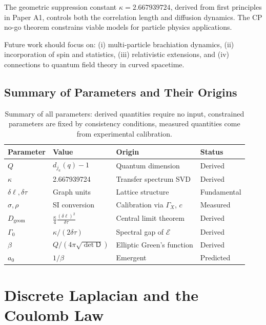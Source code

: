 \documentclass[11pt]{article}
\theoremstyle{plain}
\theoremstyle{definition}
\begin{document}
The geometric suppression constant $\kappa = 2.667939724$, derived from first principles in Paper A1, controls both the correlation length and diffusion dynamics. The CP no-go theorem constrains viable models for particle physics applications.

Future work should focus on: (i) multi-particle brachiation dynamics, (ii) incorporation of spin and statistics, (iii) relativistic extensions, and (iv) connections to quantum field theory in curved spacetime.

\subsection{Summary of Parameters and Their Origins}

\begin{table}[h]
  \centering
  \begin{tabular}{|l|l|l|l|}
    \hline
    \textbf{Parameter} & \textbf{Value} & \textbf{Origin} & \textbf{Status} \\
    \hline
    $Q$ & $d_{j_a}(q) - 1$ & Quantum dimension & Derived \\
    $\kappa$ & 2.667939724 & Transfer spectrum SVD & Derived \\
    $\delta\ell, \delta\tau$ & Graph units & Lattice structure & Fundamental \\
    $\sigma, \rho$ & SI conversion & Calibration via $\Gamma_X$, $c$ & Measured \\
    $D_{\mathrm{geom}}$ & $\frac{\kappa}{4}\frac{(\delta\ell)^2}{\delta\tau}$ & Central limit theorem & Derived \\
    $\Gamma_0$ & $\kappa/(2\delta\tau)$ & Spectral gap of $\mathcal{E}$ & Derived \\
    $\beta$ & $Q/(4\pi\sqrt{\det\mathsf{D}})$ & Elliptic Green's function & Derived \\
    $a_0$ & $1/\beta$ & Emergent & Predicted \\
    \hline
  \end{tabular}
  \caption{Summary of all parameters: derived quantities require no input, constrained parameters are fixed by consistency conditions, measured quantities come from experimental calibration.}
  \label{tab:parameters}
\end{table}

\appendix

\section{Discrete Laplacian and the Coulomb Law}
\label{app:discrete-laplacian-coulomb}
\end{document}
